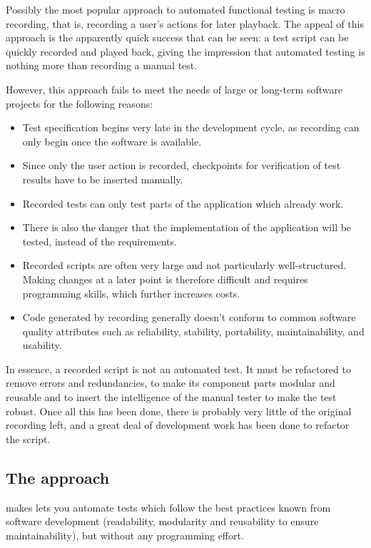 Possibly the most popular approach to automated functional testing is macro recording, that is, recording a user's actions for later playback.
The appeal of this approach is the apparently quick success that can be seen: a test script can be quickly recorded and played back, giving the impression that automated testing is nothing more than recording a manual test. 

However, this approach fails to meet the needs of large or long-term software projects for the following reasons:

\begin{itemize}
\item Test specification begins very late in the development cycle,
 as recording can only begin once the software is available. 
\item Since only the user action is recorded, checkpoints for verification
of test results have to be inserted manually.
\item Recorded tests can only test parts of the application which already work. \item There is also the danger that the implementation of the application will be tested, instead of the requirements. 
\item Recorded scripts are often very large and not particularly 
well-structured. Making changes at a later point is therefore 
difficult and requires programming skills, which further increases costs.  
\item Code generated by recording generally doesn't conform to
 common software quality attributes such as reliability, stability, 
portability, maintainability, and usability.
\end{itemize}

In essence, a recorded script is not an automated test. It must be refactored to remove errors and redundancies, to make its component parts modular and reusable and to insert the intelligence of the manual tester to make the test robust. Once all this has been done, there is probably very little of the original recording left, and a great deal of development work has been done to refactor the script.  


\subsection{The \jb{} approach}
\label{JBApproach}
\jb{} makes lets you automate tests which follow the best practices known from software development (readability, modularity and reusability to ensure maintainability), but without any programming effort. 


